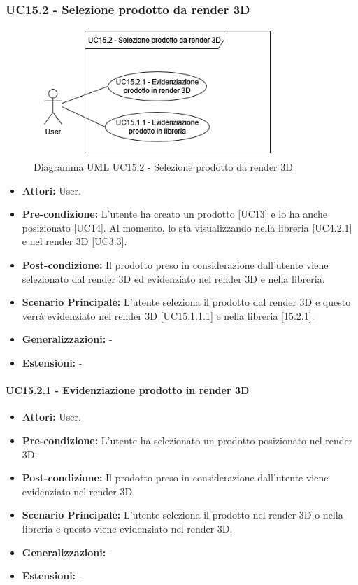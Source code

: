 \subsubsection{UC15.2 - Selezione prodotto da render 3D}
\begin{figure}[H]
  \centering
  \includegraphics[width=0.8\textwidth]{UC_diagrams_11-20/UC15.2.drawio.png}
   \caption{Diagramma UML UC15.2 - Selezione prodotto da render 3D}
\end{figure}
\begin{itemize}
    \item \textbf{Attori:} User.
    \item \textbf{Pre-condizione:} L'utente ha creato un prodotto [UC13] e lo ha anche posizionato [UC14]. Al momento, lo sta visualizzando nella libreria [UC4.2.1] e nel render 3D [UC3.3].
    \item \textbf{Post-condizione:} Il prodotto preso in considerazione dall'utente viene selezionato dal render 3D ed evidenziato nel render 3D e nella libreria.
    \item \textbf{Scenario Principale:} L'utente seleziona il prodotto dal render 3D e questo verrà evidenziato nel render 3D [UC15.1.1.1] e nella libreria [15.2.1].
    \item \textbf{Generalizzazioni:} -
    \item \textbf{Estensioni:} -
\end{itemize}


\paragraph{UC15.2.1 - Evidenziazione prodotto in render 3D}
\begin{itemize}
    \item \textbf{Attori:} User.
    \item \textbf{Pre-condizione:} L'utente ha selezionato un prodotto posizionato nel render 3D.
    \item \textbf{Post-condizione:} Il prodotto preso in considerazione dall'utente viene evidenziato nel render 3D.
    \item \textbf{Scenario Principale:} L'utente seleziona il prodotto nel render 3D o nella libreria e questo viene evidenziato nel render 3D.
    \item \textbf{Generalizzazioni:} -
    \item \textbf{Estensioni:} -
\end{itemize}


